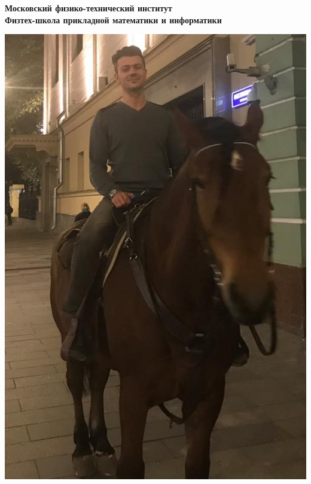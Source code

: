 \begin{titlepage}
	\clearpage\thispagestyle{empty}
	\centering
	
	\textbf{Московский физико-технический институт \\ Физтех-школа прикладной математики и информатики}
	\vspace{50pt}
    
    \noindent 
    \begin{minipage}{0.3\textwidth}
    \includegraphics[width=\textwidth]{images/Tulenev3.jpg}
    \end{minipage}
    \begin{minipage}{0.3\textwidth}

\end{minipage}
\end{titlepage}
